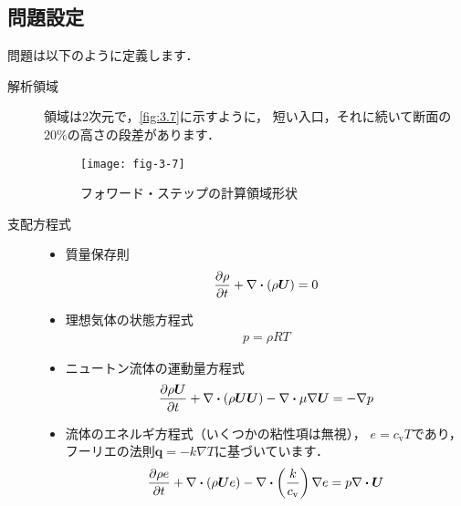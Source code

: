 \subsection{問題設定}
\label{ssec:3.3.1}
問題は以下のように定義します．
\begin{description}
 \item[解析領域] 領域は2次元で，\autoref{fig:3.7}に示すように，
            短い入口，それに続いて断面の$20\unit{\%}$の高さの段差があります．


\begin{figure}[ht]
 \texttt{[image: fig-3-7]}
 \caption{フォワード・ステップの計算領域形状}
 \label{fig:3.7}
\end{figure}


 \item[支配方程式] \mbox{}
            \begin{itemize}
             \item 質量保存則
                   \begin{align}
                    \label{eq:3.8}
                    \frac{\partial\rho}{\partial t}
                    + \nabla \inProd (\rho\bm{U}) = 0
                   \end{align}
             \item 理想気体の状態方程式
                   \begin{align}
                    \label{eq:3.9}
                    p = \rho RT
                   \end{align}
             \item ニュートン流体の運動量方程式
                   \begin{align}
                    \label{eq:3.10}
                    \frac{\partial\rho\bm{U}}{\partial t}
                    + \nabla \inProd (\rho\bm{U}\bm{U})
                    - \nabla \inProd \mu\nabla\bm{U}
                    = -\nabla p
                   \end{align}
             \item 流体のエネルギ方程式（いくつかの粘性項は無視），
                   $e = c_{\mathrm{v}}T$であり，
                   フーリエの法則$\bm{q} = -k\nabla T$に基づいています．
                   \begin{align}
                    \label{eq:3.11}
                    \frac{\partial\rho e}{\partial t}
                    + \nabla \inProd (\rho\bm{U}e)
                    - \nabla \inProd \left(\frac{k}{c_{\mathrm{v}}}\right)\nabla e
                    = p\nabla \inProd \bm{U}
                   \end{align}

\end{itemize}
\end{description}
